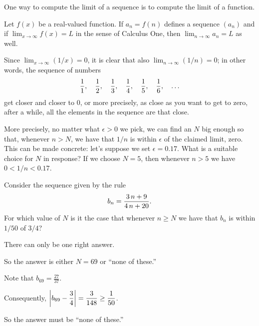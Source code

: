 \documentclass{ximera}
\begin{document}
One way to compute the limit of a sequence is to compute the limit of
a function.
\begin{theorem}
  \label{theorem:compute-limit-of-sequence-via-function}
  Let $f(x)$ be a real-valued function.  If $a_n = f(n)$ defines a
  sequence $(a_n)$ and if $\displaystyle\lim_{x\to\infty}f(x)=L$ in the sense of Calculus
  One, then $\displaystyle\lim_{n\to\infty} a_n=L$ as well.
\end{theorem}

\begin{example}
\label{example:find-n-for-epsilon}
Since $\displaystyle\lim_{x\to\infty}(1/x)=0$, it is
clear that also $\displaystyle\lim_{n\to\infty}(1/n)=0$; in other words, the sequence of numbers
$${1\over1},\quad {1\over2},\quad {1\over3},\quad {1\over4},\quad {1\over5},\quad {1\over6},\quad \ldots$$
get closer and closer to 0, or more precisely, as close as you want to get to zero, after a while, all the elements in the sequence are that close.

More precisely, no matter what $\epsilon > 0$ we pick, we can find an
$N$ big enough so that, whenever $n > N$, we have that $1/n$ is within
$\epsilon$ of the claimed limit, zero.  This can be made concrete:
let's suppose we set $\epsilon = 0.17$.  What is a suitable choice for
$N$ in response?  If we choose $N = 5$, then whenever $n > 5$ we have
$0 < 1/n < 0.17$.
\end{example}


\begin{question}
  Consider the sequence given by the rule \[b_{n} = \displaystyle\displaystyle\frac{ 3 \, n + 9 }{ 4 \, n + 20 }.\]  For which value of $N$ is it the case that whenever $n \geq N$ we have that $b_{n}$ is within $1/50$ of $3/4$?

    \begin{hint}
      There can only be one right answer.
    \end{hint}
    \begin{hint}
      So the answer is either $N = 69$ or ``none of these.''
    \end{hint}
    \begin{hint}
      Note that $b_{69} = \displaystyle\frac{27}{37}$.
    \end{hint}
    \begin{hint}
      Consequently, $\left| b_{69} - \displaystyle \displaystyle\frac{3}{4} \right| = \displaystyle\frac{3}{148} \geq \displaystyle\frac{1}{50}$.
    \end{hint}
    \begin{hint}
      So the answer must be ``none of these.''
    \end{hint}

    \begin{multipleChoice}
    \end{multipleChoice}

\end{question}
\end{document}
